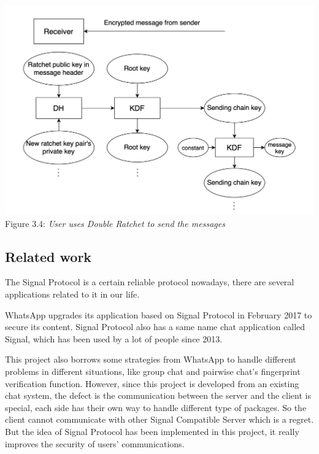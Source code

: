 \begin{enumerate}[label=(\roman*)]
\begin{center}
\includegraphics[scale=.4]{../3-Background/resources/DH-send.png}\\
Figure 3.4: \textit{User uses Double Ratchet to send the messages}
\end{center}

\end{enumerate}

\subsection{Related work}
The Signal Protocol is a certain reliable protocol nowadays, there are several applications related to it in our life.

WhatsApp upgrades its application based on Signal Protocol in February 2017 to secure its content. Signal Protocol also has a same name chat application called Signal, which has been used by a lot of people since 2013.

 This project also borrows some strategies from WhatsApp to handle different problems in different situations, like group chat and pairwise chat's fingerprint verification function. However, since this project is developed from an existing chat system, the defect is the communication between the server and the client is special, each side has their own way to handle different type of packages. So the client cannot communicate with other Signal Compatible Server which is a regret. But the idea of Signal Protocol has been implemented in this project, it really improves the security of users' communications.

\clearpage